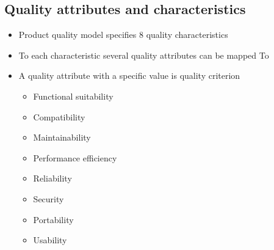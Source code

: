 \documentclass{article}
\begin{document}
\subsection{Quality attributes and characteristics}
\begin{itemize}
    \item Product quality model specifies 8 quality characteristics
    \item To each characteristic several quality attributes can be mapped To
    \item A quality attribute with a specific value is quality criterion
          \begin{itemize}
              \item Functional suitability
              \item Compatibility
              \item Maintainability
              \item Performance efficiency
              \item Reliability
              \item Security
              \item Portability
              \item Usability
          \end{itemize}
\end{itemize}
\end{document}
